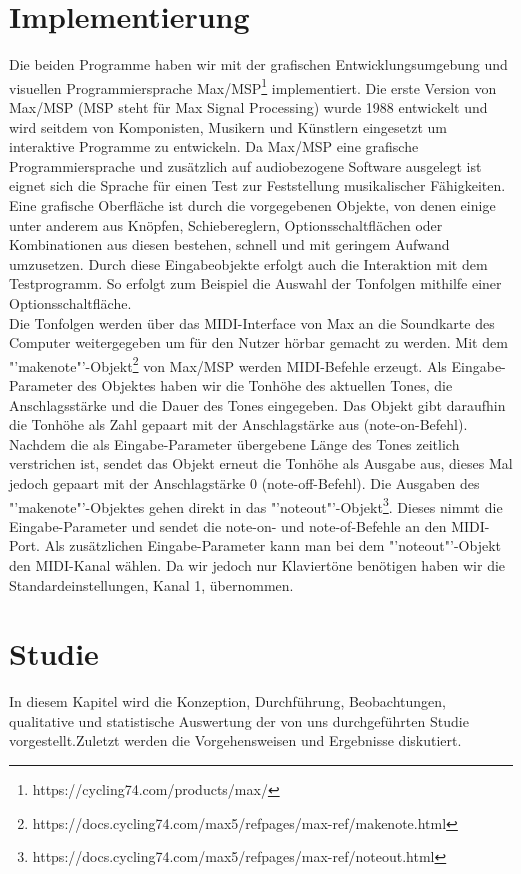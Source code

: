 \documentclass{acm_proc_article-sp}
\begin{document}
\section{Implementierung}
Die beiden Programme haben wir mit der grafischen Entwicklungsumgebung und visuellen Programmiersprache Max\slash MSP\footnote{https://cycling74.com/products/max/} implementiert. Die erste Version von Max\slash MSP (MSP steht für Max Signal Processing) \cite{wiki:max} wurde 1988 entwickelt und wird seitdem von Komponisten, Musikern und Künstlern eingesetzt um interaktive Programme zu entwickeln. Da Max\slash MSP eine grafische Programmiersprache und zusätzlich auf audiobezogene Software ausgelegt ist eignet sich die Sprache für einen Test zur Feststellung musikalischer Fähigkeiten.\\
Eine grafische Oberfläche ist durch die vorgegebenen Objekte, von denen einige unter anderem aus Knöpfen, Schiebereglern, Optionsschaltflächen oder Kombinationen aus diesen bestehen, schnell und mit geringem Aufwand umzusetzen. Durch diese Eingabeobjekte erfolgt auch die Interaktion mit dem Testprogramm. So erfolgt zum Beispiel die Auswahl der Tonfolgen mithilfe einer Optionsschaltfläche.\\
Die Tonfolgen werden über das MIDI-Interface von Max an die Soundkarte des Computer weitergegeben um für den Nutzer hörbar gemacht zu werden. Mit dem "'makenote"'-Objekt\footnote{https://docs.cycling74.com/max5/refpages/max-ref/makenote.html} von Max\slash MSP werden MIDI-Befehle erzeugt. Als Eingabe-Parameter des Objektes haben wir die Tonhöhe des aktuellen Tones, die Anschlagsstärke und die Dauer des Tones  eingegeben. Das Objekt gibt daraufhin die Tonhöhe als Zahl gepaart mit der Anschlagstärke aus (note-on-Befehl). Nachdem die als Eingabe-Parameter übergebene Länge des Tones zeitlich verstrichen ist, sendet das Objekt erneut die Tonhöhe als Ausgabe aus, dieses Mal jedoch gepaart mit der Anschlagstärke 0 (note-off-Befehl). Die Ausgaben des "'makenote"'-Objektes gehen direkt in das "'noteout"'-Objekt\footnote{https://docs.cycling74.com/max5/refpages/max-ref/noteout.html}. Dieses nimmt die Eingabe-Parameter und sendet die note-on- und note-of-Befehle an den MIDI-Port. Als zusätzlichen Eingabe-Parameter kann man bei dem "'noteout"'-Objekt den MIDI-Kanal wählen. Da wir jedoch nur Klaviertöne benötigen haben wir die Standardeinstellungen, Kanal 1, übernommen.

\section{Studie}
In diesem Kapitel wird die Konzeption, Durchführung, Beobachtungen, qualitative und statistische Auswertung der von uns durchgeführten Studie vorgestellt.Zuletzt werden die Vorgehensweisen und Ergebnisse diskutiert.
\end{document}

